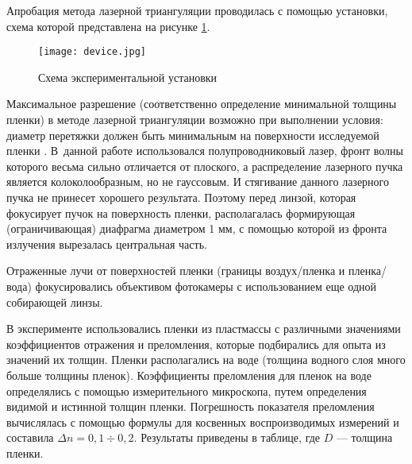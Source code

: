 Апробация метода лазерной триангуляции проводилась с помощью установки, схема которой представлена на рисунке \ref{ris:device}.

\begin{figure}[h]
\begin{center}
\texttt{[image: device.jpg]}
\end{center}\vspace*{-3mm}
\caption{Схема экспериментальной установки}
\label{ris:device}
\end{figure}

Максимальное разрешение (соответственно определение минимальной толщины пленки) в методе лазерной триангуляции возможно при выполнении условия: диаметр перетяжки должен быть минимальным на поверхности исследуемой пленки \cite{andreev, burkov, barishnikov}. В~данной работе использовался полупроводниковый лазер, фронт волны которого весьма сильно отличается от плоского, а распределение лазерного пучка является колоколообразным, но не гауссовым. И стягивание данного лазерного пучка не принесет хорошего результата. Поэтому перед линзой, которая фокусирует пучок на поверхность пленки, располагалась формирующая (ограничивающая) диафрагма диаметром 1 мм, с помощью которой из фронта излучения вырезалась центральная часть.


Отраженные лучи от поверхностей пленки (границы воздух/пленка и плен\-ка/во\-да) фокусировались объективом фотокамеры с использованием еще одной собирающей линзы.


В эксперименте использовались пленки из пластмассы с различными значениями коэффициентов отражения и преломления, которые подбирались для опыта из значений их толщин. Пленки располагались на воде (толщина водного слоя много больше толщины пленок). Коэффициенты преломления для пленок на воде определялись с помощью измерительного микроскопа, путем определения видимой и истинной толщин пленки. Погрешность показателя преломления вычислялась с помощью формулы для косвенных воспроизводимых измерений \cite{kassandrova} и составила $\Delta n = 0,1 \div 0,2$. Результаты приведены в таблице, где $D$ --- толщина пленки.

